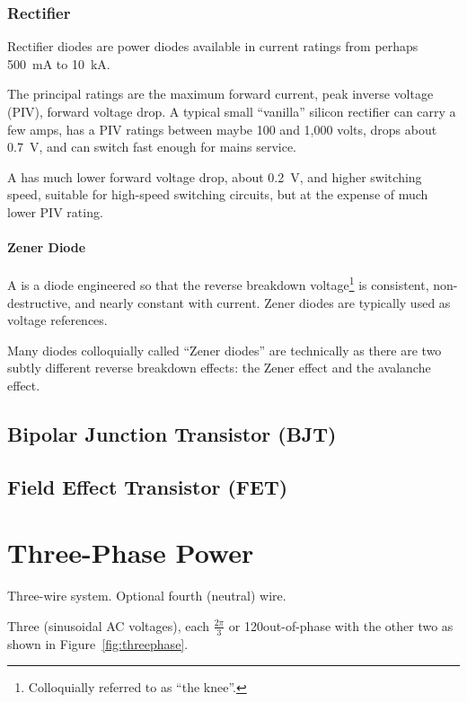\documentclass[11pt]{article}
\begin{document}
\subsubsection{Rectifier}

Rectifier diodes are power diodes available in current ratings from
perhaps 500~\unit{mA} to 10~\unit{kA}.

The principal ratings are the maximum forward current, peak inverse
voltage (PIV), forward voltage drop. A typical small ``vanilla''
silicon rectifier can carry a few amps, has a PIV ratings between
maybe 100 and 1,000 volts, drops about 0.7~\unit{V}, and can switch
fast enough for mains service.

A  has much lower forward voltage drop, about
0.2~\unit{V}, and higher switching speed, suitable for high-speed
switching circuits, but at the expense of much lower PIV rating.

\paragraph{Zener Diode}

A  is a diode engineered so that the reverse
breakdown voltage\footnote{Colloquially referred to as ``the knee''.}
is consistent, non-destructive, and nearly constant with
current. Zener diodes are typically used as voltage references.

Many diodes colloquially called ``Zener diodes'' are technically
 as there are two subtly different reverse
breakdown effects: the Zener effect and the avalanche effect.


\subsection{Bipolar Junction Transistor (BJT)}



\subsection{Field Effect Transistor (FET)}


\section{Three-Phase Power}

Three-wire system. Optional fourth (neutral) wire.

Three  (sinusoidal AC voltages), each $\frac{2\pi}{3}$ or
120\deg out-of-phase with the other two as shown in
Figure~\ref{fig:threephase}.
\end{document}
